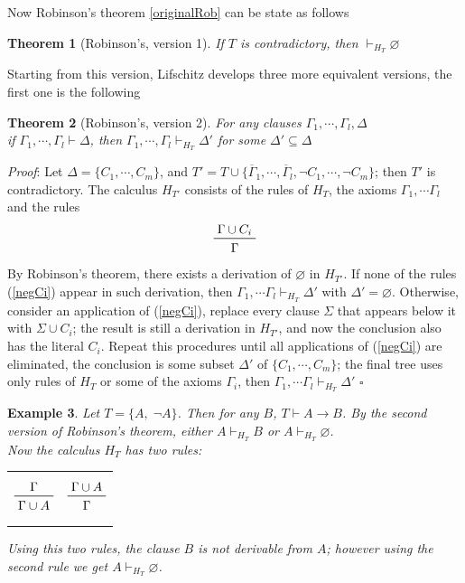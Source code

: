 \documentclass[a4paper,12pt,oneside]{book}
\newtheorem{theorem}{Theorem}[chapter]
\newtheorem{example}[theorem]{Example}
\newcommand*{\QED}{\hfill\ensuremath{\square}}
\let\emptyset\varnothing
\begin{document}
Now Robinson's theorem \ref{originalRob} can be state as follows
\begin{theorem}[Robinson's, version 1]
If $T$ is contradictory, then $\vdash_{H_T} \emptyset$
\end{theorem}
\noindent Starting from this version, Lifschitz develops three more equivalent versions, the first one is the following
\begin{theorem}[Robinson's, version 2]\label{robinson2}
For any clauses $\Gamma_1,\cdots,\Gamma_l,\Delta$\\ 
if $\Gamma_1,\cdots ,\Gamma_l\vdash \Delta$,  then $\Gamma_1,\cdots ,\Gamma_l\vdash_{H_T} \Delta'$ for some $\Delta'\subseteq\Delta$
\end{theorem}

\textit{Proof}: Let $\Delta=\{C_1,\cdots,C_m\}$, and $T'= T\cup\{ \overline{\Gamma}_1, \cdots ,\overline{\Gamma}_l, \neg C_1,\cdots ,\neg C_m\}  $; then $T'$ is contradictory.
The calculus $H_{T'}$ consists of the rules of $H_T$, the axioms $\Gamma_1,\cdots\Gamma_l$ and the rules
\begin{equation}\label{negCi}
\prftree{\Gamma\cup C_i }{\Gamma }
\end{equation}
By Robinson's theorem, there exists a derivation of $\emptyset$ in $H_{T'}$. If none of the rules (\ref{negCi}) appear in such derivation, then $\Gamma_1,\cdots\Gamma_l\vdash_{H_T} \Delta'$ with $\Delta'=\emptyset$. Otherwise, consider an application of (\ref{negCi}), replace every clause $\Sigma$ that appears below it with $\Sigma\cup C_i$; the result is still a derivation in $H_{T'}$, and now the conclusion also has the literal $C_i$. Repeat this procedures until all applications of (\ref{negCi}) are eliminated, the conclusion is some subset $\Delta'$ of 	$\{C_1,\cdots,C_m\}$; the final tree uses only rules of $H_T$ or some of the axioms $\Gamma_i$, then 
$\Gamma_1,\cdots\Gamma_l\vdash_{H_T} \Delta'$
\QED


\begin{example} Let $T=\{ A ,\; \neg A \}$. Then for any $B$, $T\vdash A\rightarrow B$.
By the second version of Robinson's theorem, either $ A \vdash_{H_T} B $ or  $ A \vdash_{H_T} \emptyset$. \\Now the calculus $H_T$ has two rules:

\begin{center}
\begin{tabular}{cc}

$$\prftree{\Gamma }  {\Gamma\cup A} 
$$
& \hspace{10mm}
$$\prftree{\Gamma \cup A }  {\Gamma }
$$
\end{tabular}
\end{center}
Using this two rules, the clause $B$ is not derivable from $A$; however using the second rule we get $ A \vdash_{H_T} \emptyset$.
\end{example}
 
\end{document}
